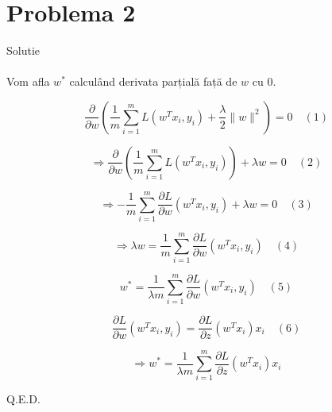 \documentclass{article}
\begin{document}
\section*{Problema 2}

Solutie \\\\

\noindent Vom afla $w^*$ calculând derivata parțială față de $w$ cu 0.

\noindent \[
\frac{\partial}{\partial w} \left( \frac{1}{m} \sum_{i=1}^{m} L(w^T x_i, y_i) + \frac{\lambda}{2} \|w\|^2 \right) = 0 \quad (1)
\]

\noindent \[
\Rightarrow \frac{\partial}{\partial w} \left( \frac{1}{m} \sum_{i=1}^{m} L(w^T x_i, y_i) \right) + \lambda w = 0 \quad (2)
\]

\noindent \[
\Rightarrow -\frac{1}{m} \sum_{i=1}^{m} \frac{\partial L}{\partial w} (w^T x_i, y_i) + \lambda w = 0 \quad (3)
\]

\noindent \[
\Rightarrow \lambda w = \frac{1}{m} \sum_{i=1}^{m} \frac{\partial L}{\partial w} (w^T x_i, y_i) \quad (4)
\]

\noindent \[
w^* = \frac{1}{\lambda m} \sum_{i=1}^{m} \frac{\partial L}{\partial w} (w^T x_i, y_i) \quad (5)
\]

\noindent \[
\frac{\partial L}{\partial w} (w^T x_i, y_i) = \frac{\partial L}{\partial z} (w^T x_i) x_i \quad (6)
\]

\noindent \[
\Rightarrow w^* = \frac{1}{\lambda m} \sum_{i=1}^{m} \frac{\partial L}{\partial z} (w^T x_i) x_i
\]

Q.E.D.
\end{document}
